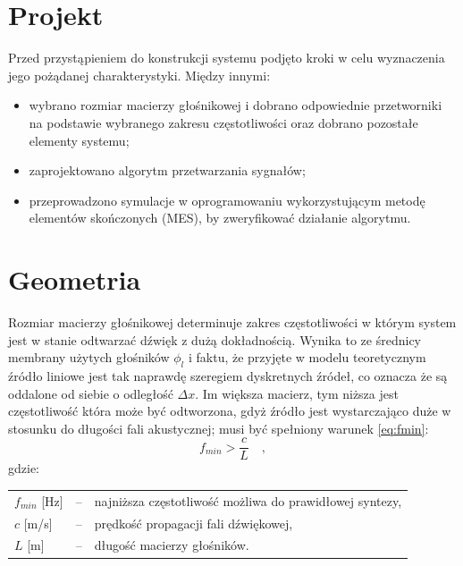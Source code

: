 \documentclass[12pt]{oska}
\let\Oldsection\section
\renewcommand{\section}{\FloatBarrier\Oldsection}
\begin{document}
\section{Projekt}

Przed przystąpieniem do konstrukcji systemu podjęto kroki w celu wyznaczenia jego pożądanej
charakterystyki. Między innymi:
\begin{itemize}
  \item wybrano rozmiar macierzy głośnikowej i dobrano odpowiednie przetworniki
  na podstawie wybranego zakresu częstotliwości oraz dobrano pozostałe elementy systemu;
  \item zaprojektowano algorytm przetwarzania sygnałów;
  \item przeprowadzono symulacje w oprogramowaniu wykorzystującym metodę
    elementów skończonych (MES), by zweryfikować działanie algorytmu.
\end{itemize}

\section{Geometria}

Rozmiar macierzy głośnikowej determinuje zakres częstotliwości w którym system
jest w stanie odtwarzać dźwięk z dużą dokładnością. Wynika to ze średnicy
membrany użytych głośników $\phi_l$ i faktu, że przyjęte w modelu teoretycznym źródło liniowe jest
tak naprawdę szeregiem dyskretnych źródeł, co oznacza że są oddalone od siebie o
odległość $\Delta x$. Im większa macierz, tym niższa jest częstotliwość która
może być odtworzona, gdyż źródło jest wystarczająco duże w stosunku do długości
fali akustycznej; musi być spełniony warunek \eqref{eq:fmin}:
\begin{equation}
  f_{min}>\frac{c}{L} \quad,	\label{eq:fmin}
\end{equation}
gdzie:\\
	\indent \begin{tabular}{l c l}
			$f_{min}$ [\si{\hertz}] & -- & najniższa częstotliwość możliwa do prawidłowej syntezy, \\
			$c$ [\si[per-mode=symbol]{\metre\per\second}] & -- & prędkość propagacji fali dźwiękowej, \\
			$L$ [\si{\metre}] & -- & długość macierzy głośników. \\
		\end{tabular}
\end{document}
